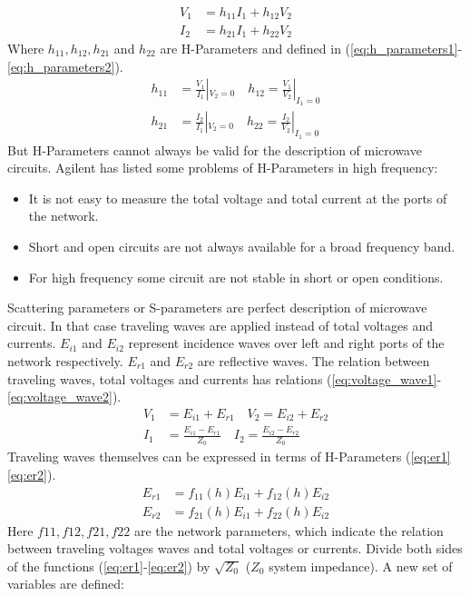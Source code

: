 \begin{align}
V_{1}&=h_{11}I_{1}+h_{12}V_{2}\\
I_{2}&=h_{21}I_{1}+h_{22}V_{2}
\label{eq:voltage_current}
\end{align}
Where $h_{11},h_{12},h_{21}$ and $h_{22}$ are H-Parameters and defined in (\ref{eq:h_parameters1}-\ref{eq:h_parameters2}).
\begin{align}
h_{11}&=\frac{V_{1}}{I_{1}}|_{V_{2}=0}\quad h_{12}=\frac{V_{1}}{V_{2}}|_{I_{1}=0}
\label{eq:h_parameters1}\\
h_{21}&=\frac{I_{2}}{I_{1}}|_{V_{2}=0}\quad h_{22}=\frac{I_{2}}{V_{2}}|_{I_{1}=0}
\label{eq:h_parameters2}
\end{align}
But H-Parameters cannot always be valid for the description of microwave circuits. Agilent\cite{aglient_s_parameters} has listed some problems of H-Parameters in high frequency:
\begin{itemize}
\item It is not easy to measure the total voltage and total current at the ports of the network.
\item Short and open circuits are not always available for a broad frequency band.
\item For high frequency some circuit are not stable in short or open conditions.
\end{itemize}
Scattering parameters or S-parameters are perfect description of microwave circuit\cite{RF194_s_parameters}. In that case traveling waves are applied instead of total voltages and currents. $E_{i1}$ and $E_{i2}$ represent incidence waves over left and right ports of the network respectively. $E_{r1}$ and $E_{r2}$ are reflective waves. The relation between traveling waves, total voltages and currents has relations (\ref{eq:voltage_wave1}-\ref{eq:voltage_wave2}).
\begin{align}
V_{1}&=E_{i1}+E_{r1}\quad V_{2}=E_{i2}+E_{r2}
\label{eq:voltage_wave1}\\
I_{1}&=\frac{E_{i1}-E_{r1}}{Z_{0}}\quad I_{2}=\frac{E_{i2}-E_{r2}}{Z_{0}}
\label{eq:voltage_wave2}
\end{align}
Traveling waves themselves can be expressed in terms of H-Parameters (\ref{eq:er1}\ref{eq:er2}). 
\begin{align}
E_{r1}&=f_{11}(h)E_{i1}+f_{12}(h)E_{i2}
\label{eq:er1}
\\
E_{r2}&=f_{21}(h)E_{i1}+f_{22}(h)E_{i2}
\label{eq:er2}
\end{align}
Here $f11, f12, f21, f22$ are the network parameters, which indicate the relation between traveling voltages waves and total voltages or currents. Divide both sides of the functions (\ref{eq:er1}-\ref{eq:er2}) by $\sqrt{Z_{0}}$ ($Z_{0}$ system impedance). A new set of variables are defined:
